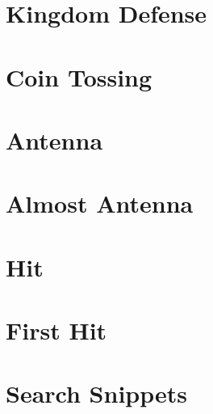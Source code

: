 \documentclass[a4paper, 10pt]{article}
\let\stdsection\section
\renewcommand\section{\newpage\stdsection}
\newcommand{\includecode}[1]{
    }
\begin{document}
    \section{Kingdom Defense}
        \includecode{../problems/w05/Kingdom_Defense/KingdomDefence1.cpp}
    
    \section{Coin Tossing}
        \includecode{../problems/w05/Coin_Tossing/CoinToss1.cpp}
          

    \section{Antenna}
        \includecode{../problems/w06/Antenna/Antenna1.cpp}
        
    \section{Almost Antenna}
        \includecode{../problems/w06/AlmostAntenna/AlmostAntenna1.cpp}
        
    \section{Hit}
        \includecode{../problems/w06/Hit/Hit1.cpp}
        
    \section{First Hit}
        \includecode{../problems/w06/FirstHit/FirstHit1.cpp}
    
    \section{Search Snippets}
        \includecode{../problems/w06/Search_Snippets/SearchSnippets1.cpp}
              
\end{document}
